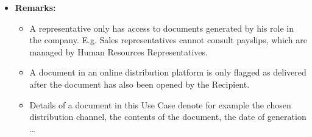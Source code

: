 \documentclass[a4paper,10pt]{article}
\begin{document}
\begin{itemize}
    \item \textbf{Remarks:}
        \begin{itemize}
            \item A representative only has access to documents generated by his role in the company. E.g. Sales representatives cannot consult payslips, which are managed by Human Resources Representatives.
            \item A document in an online distribution platform is only flagged as delivered after the document has also been opened by the Recipient.
            \item Details of a document in this Use Case denote for example the chosen distribution channel, the contents of the document, the date of generation \ldots
        \end{itemize}
\end{itemize}
\end{document}
